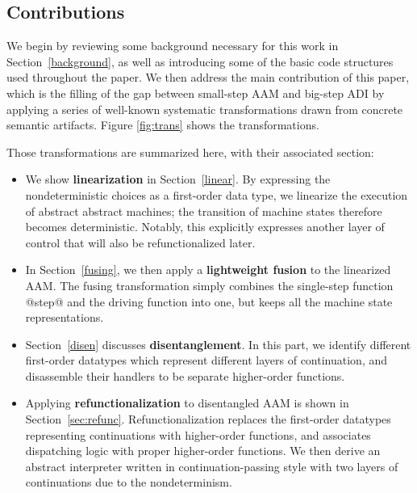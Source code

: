 \documentclass[acmsmall, review]{acmart}\settopmatter{}
\begin{document}
\subsection{Contributions}

We begin by reviewing some background necessary for this work in Section~\ref{background}, 
as well as introducing some of the basic code structures used throughout the paper. 
We then address the main contribution of this paper, which is the filling of the gap between
small-step AAM and big-step ADI by applying a series of well-known systematic transformations
drawn from concrete semantic artifacts.
Figure \ref{fig:trans} shows the transformations.

Those transformations are summarized here, with their associated section:

\begin{itemize}
  \item We show \textbf{linearization} in Section~\ref{linear}. By expressing the
    nondeterministic choices as a first-order data type, we linearize the execution
    of abstract abstract machines; the transition of machine states therefore becomes 
    deterministic. Notably, this explicitly expresses another layer of control that 
    will also be refunctionalized later.

  \item In Section~\ref{fusing}, we then apply a \textbf{lightweight fusion} 
    \cite{DANVY2008100, Ohori:2007:LFF:1190216.1190241} to the linearized AAM. 
    The fusing transformation simply combines the single-step function @step@ and the 
    driving function into one, but keeps all the machine state representations.

  \item Section~\ref{disen} discusses \textbf{disentanglement}. In this part, we identify 
    different first-order datatypes which represent different layers of continuation, and
    disassemble their handlers to be separate higher-order functions.

  \item Applying \textbf{refunctionalization} \cite{DANVY2009534, Danvy:2006:RW:2171265.2171268} 
    to disentangled AAM is shown in Section~\ref{sec:refunc}. 
    Refunctionalization replaces the first-order datatypes representing continuations with
    higher-order functions, and associates dispatching logic with proper higher-order functions. 
    We then derive an abstract interpreter written in continuation-passing style with two
    layers of continuations due to the nondeterminism.


\end{itemize}
\end{document}
